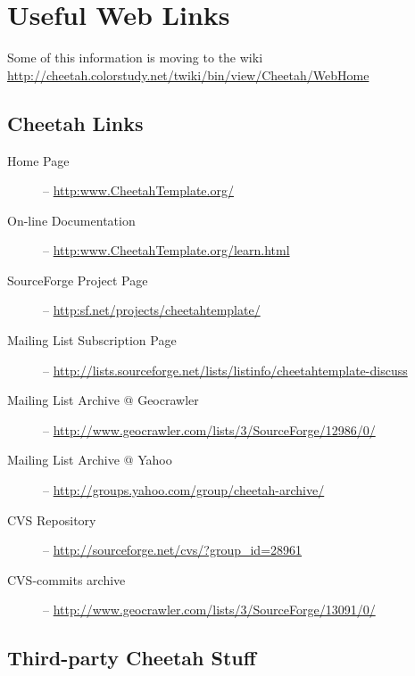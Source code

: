 \section{Useful Web Links}
\label{links}

Some of this information is moving to the wiki
\url{http://cheetah.colorstudy.net/twiki/bin/view/Cheetah/WebHome}


\subsection{Cheetah Links}
\label{links.cheetah}

\begin{description}
\item[Home Page] -- \url{http:www.CheetahTemplate.org/}
     
\item[On-line Documentation] -- \url{http:www.CheetahTemplate.org/learn.html}
     
\item[SourceForge Project Page] -- \url{http:sf.net/projects/cheetahtemplate/}
     
\item[Mailing List Subscription Page] --
     \url{http://lists.sourceforge.net/lists/listinfo/cheetahtemplate-discuss}
     
\item[Mailing List Archive @ Geocrawler] --
     \url{http://www.geocrawler.com/lists/3/SourceForge/12986/0/}

\item[Mailing List Archive @ Yahoo] --
     \url{http://groups.yahoo.com/group/cheetah-archive/}
    
\item[CVS Repository] -- \url{http://sourceforge.net/cvs/?group_id=28961}
     
\item[CVS-commits archive] --
     \url{http://www.geocrawler.com/lists/3/SourceForge/13091/0/}

\end{description}

\subsection{Third-party Cheetah Stuff}
\label{links.cheetah}

